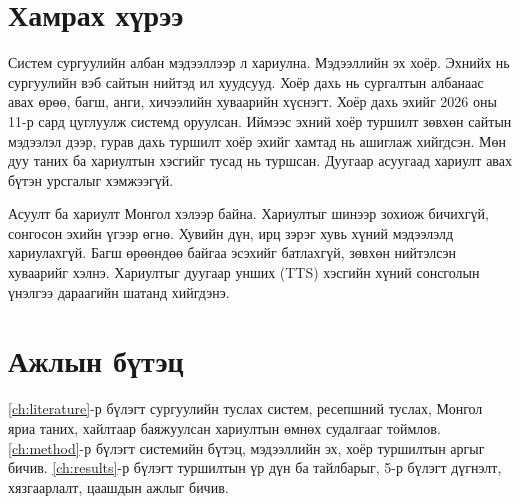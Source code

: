 \section{Хамрах хүрээ}
\label{sec:intro-scope}

Систем сургуулийн албан мэдээллээр л хариулна. Мэдээллийн эх хоёр. Эхнийх нь сургуулийн вэб сайтын нийтэд ил хуудсууд. Хоёр дахь нь сургалтын албанаас авах өрөө, багш, анги, хичээлийн хуваарийн хүснэгт. Хоёр дахь эхийг 2026 оны 11-р сард цуглуулж системд оруулсан. Иймээс эхний хоёр туршилт зөвхөн сайтын мэдээлэл дээр, гурав дахь туршилт хоёр эхийг хамтад нь ашиглаж хийгдсэн. Мөн дуу таних ба хариултын хэсгийг тусад нь туршсан. Дуугаар асуугаад хариулт авах бүтэн урсгалыг хэмжээгүй.

Асуулт ба хариулт Монгол хэлээр байна. Хариултыг шинээр зохиож бичихгүй, сонгосон эхийн үгээр өгнө. Хувийн дүн, ирц зэрэг хувь хүний мэдээлэлд хариулахгүй. Багш өрөөндөө байгаа эсэхийг батлахгүй, зөвхөн нийтэлсэн хуваарийг хэлнэ. Хариултыг дуугаар унших (\ac{TTS}) хэсгийн хүний сонсголын үнэлгээ дараагийн шатанд хийгдэнэ.

\section{Ажлын бүтэц}
\label{sec:intro-structure}

\ref{ch:literature}-р бүлэгт сургуулийн туслах систем, ресепшний туслах, Монгол яриа таних, хайлтаар баяжуулсан хариултын өмнөх судалгааг тоймлов. \ref{ch:method}-р бүлэгт системийн бүтэц, мэдээллийн эх, хоёр туршилтын аргыг бичив. \ref{ch:results}-р бүлэгт туршилтын үр дүн ба тайлбарыг, 5-р бүлэгт дүгнэлт, хязгаарлалт, цаашдын ажлыг бичив.
